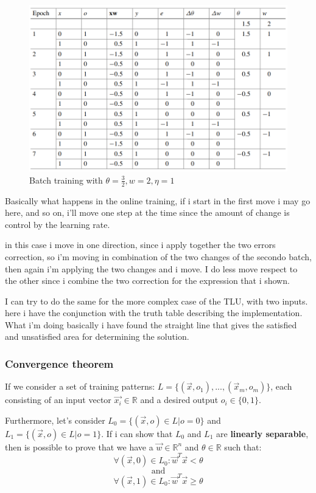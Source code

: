 \documentclass{article}
\begin{document}
\begin{figure}[H]
    \centering
    \includegraphics[scale=0.5]{images/batch_training.png}
    \caption{Batch training with $\theta = \frac{3}{2},w=2,\eta = 1$}
\end{figure}

Basically what happens in the online training, if i start in the first move i may go here,
and so on, i'll move one step at the time since the amount of change is control by the
learning rate.

in this case i move in one direction, since i apply together the two errors correction,
so i'm moving in combination of the two changes of the secondo batch, then again i'm applying
the two changes and i move. I do less move respect to the other since  i combine the two
correction for the expression that i shown.

I can try to do the same for the more complex case of the TLU, with two inputs. here i have
the conjunction with the truth table describing the implementation. What i'm doing basically
i have found the straight line that gives the satisfied and unsatisfied area for determining
the solution.

\subsubsection{Convergence theorem}
If we consider a set of training patterns: $L=\{(\vec{x},o_1),...,(\vec{x}_m,o_m)\}$,
each consisting of an input vector $\vec{x_i}\in\mathbb{R}$ and a desired
output $o_i\in\{0,1\}$.

Furthermore, let's consider $L_0=\{(\vec{x},o)\in L|o=0\}$ and
$L_1=\{(\vec{x},o)\in L | o=1\}$. If i can show that $L_0$ and $L_1$ are
\textbf{linearly separable}, then is possible to prove that we have a
$\vec{w}\in\mathbb{R}^n$ and $\theta\in\mathbb{R}$ such that:
$$\forall (\vec{x},0)\in L_0 :\vec{w}^T\vec{x} <\theta$$
$$\text{and}$$
$$\forall (\vec{x},1)\in L_0:\vec{w}^T\vec{x}\geq\theta$$
\end{document}
